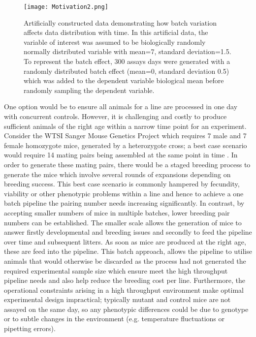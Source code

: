 \documentclass[12pt,a4paper]{article}
\begin{document}
\begin{figure}[!htpb]%
\centerline{\texttt{[image: Motivation2.png]}}
\caption{Artificially constructed data demonstrating how batch variation affects data distribution with time.  In this artificial data, the variable of interest was assumed to be biologically randomly normally distributed variable with mean=7, standard deviation=1.5. To represent the batch effect, 300 assays days were generated with a randomly distributed batch effect (mean=0, standard deviation 0.5) which was added to the dependent variable biological mean before randomly sampling the dependent variable. }\label{fig:002}
\end{figure}

One option would be to ensure all animals for a line are processed in one day with concurrent controls.  However, it is challenging and costly to produce sufficient animals of the right age within a narrow time point for an experiment.  Consider the WTSI Sanger Mouse Genetics Project which requires 7 male and 7 female homozygote mice, generated by a heterozygote cross; a best case scenario would require 14 mating pairs being assembled at the same point in time \cite{Pinkert}.  In order to generate these mating pairs, there would be a staged breeding process to generate the mice which involve several rounds of expansions depending on breeding success.  This best case scenario is commonly hampered by fecundity, viability or other phenotypic problems within a line and hence to achieve a one batch pipeline the pairing number needs increasing significantly.  In contrast, by accepting smaller numbers of mice in multiple batches, lower breeding pair numbers can be established.  The smaller scale allows the 
generation of mice to answer firstly developmental and breeding issues and secondly to feed the pipeline over time and subsequent litters.  As soon as mice are produced at the right age, these are feed into the pipeline.  This batch approach, allows the pipeline to utilise animals that would otherwise be discarded as the process had not generated the required experimental sample size which ensure meet the high throughput pipeline needs and also help reduce the breeding cost per line.  Furthermore, the operational constraints arising in a high throughput environment make optimal experimental design impractical; typically mutant and control mice are not assayed on the same day, so any phenotypic differences could be due to genotype or to subtle changes in the environment (e.g. temperature fluctuations or pipetting errors).  
 
\end{document}
